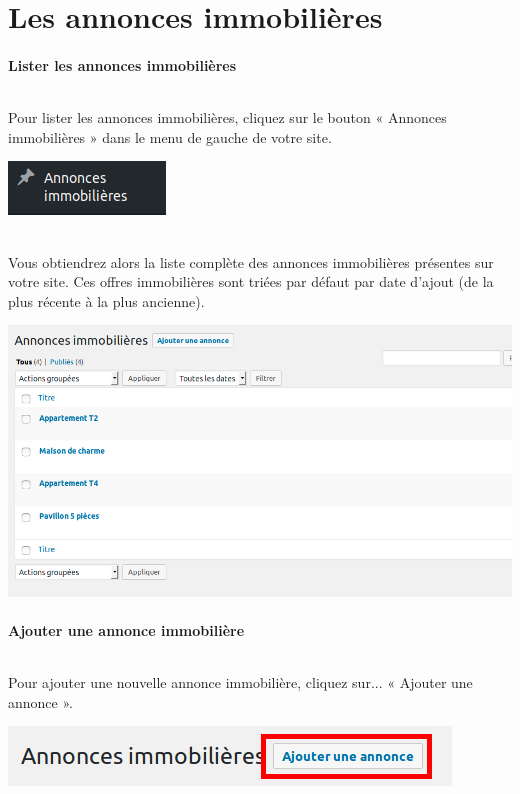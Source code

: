 \documentclass[10pt,a4paper]{article}
\begin{document}
\part{Les annonces immobilières}
\newpage

\subsection{Lister les annonces immobilières}
\paragraph{}Pour lister les annonces immobilières, cliquez sur le bouton « Annonces immobilières » dans le menu de gauche de votre site.
\begin{center}
\includegraphics[scale=0.3]{img/0314.png}
\end{center}
\paragraph{}Vous obtiendrez alors la liste complète des annonces immobilières présentes sur votre site. Ces offres immobilières sont triées par défaut par date d'ajout (de la plus récente à la plus ancienne).
\begin{center}
\includegraphics[scale=0.2]{img/0315.png}
\end{center}
\subsection{Ajouter une annonce immobilière}
\paragraph{}Pour ajouter une nouvelle annonce immobilière, cliquez sur... « Ajouter une annonce ».
\begin{center}
\includegraphics[scale=0.3]{img/0316.png}
\end{center}
\end{document}
